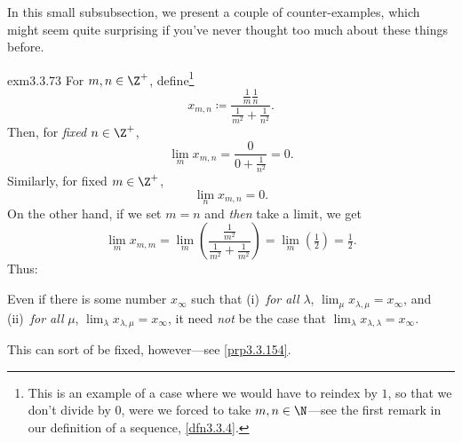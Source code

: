 In this small subsubsection, we present a couple of counter-examples, which might seem quite surprising if you've never thought too much about these things before.
\begin{exm}{}{exm3.3.73}
For $m,n\in \Z ^+$, define\footnote{This is an example of a case where we would have to reindex by $1$, so that we don't divide by $0$, were we forced to take $m,n\in \N$---see the first remark in our definition of a sequence, \cref{dfn3.3.4}.}
\begin{equation}
x_{m,n}\coloneqq \frac{\tfrac{1}{m}\tfrac{1}{n}}{\tfrac{1}{m^2}+\tfrac{1}{n^2}}.
\end{equation}
Then, for \emph{fixed} $n\in \Z ^+$,
\begin{equation}
\lim _mx_{m,n}=\frac{0}{0+\tfrac{1}{n^2}}=0.
\end{equation}
Similarly, for fixed $m\in \Z ^+$,
\begin{equation}
\lim _nx_{m,n}=0.
\end{equation}
On the other hand, if we set $m=n$ and \emph{then} take a limit, we get
\begin{equation}
\lim _mx_{m,m}=\lim _m\left( \frac{\tfrac{1}{m^2}}{\tfrac{1}{m^2}+\tfrac{1}{m^2}}\right) =\lim _m(\tfrac{1}{2})=\tfrac{1}{2}.
\end{equation}
Thus:
\begin{displayquote}
Even if there is some number $x_\infty$ such that (i)~\emph{for all} $\lambda$, $\lim _\mu x_{\lambda ,\mu}=x_\infty$, and (ii)~\emph{for all} $\mu$, $\lim _\lambda x_{\lambda ,\mu}=x_\infty$, it need \emph{not} be the case that $\lim _\lambda x_{\lambda ,\lambda}=x_\infty$.
\end{displayquote}
This can sort of be fixed, however---see \cref{prp3.3.154}.
\end{exm}
